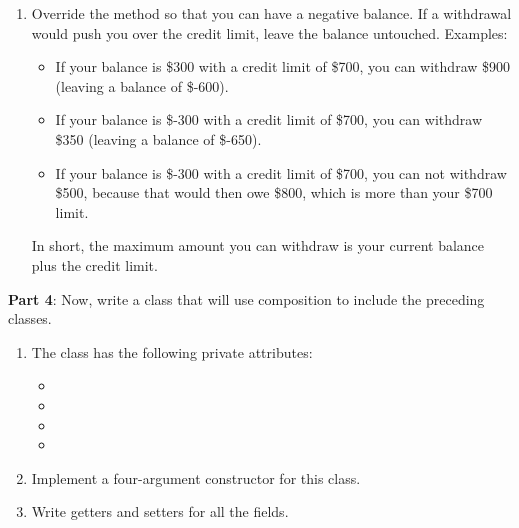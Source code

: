 \begin{exercise}
\begin{enumerate}
\item Override the  method so that you can have a negative balance. If a withdrawal would push you over the credit limit, leave the balance untouched. Examples:

\begin{itemize}
\item If your balance is \$300 with a credit limit of \$700, you can withdraw \$900 (leaving a balance of \$-600).
\item If your balance is \$-300 with a credit limit of \$700, you can withdraw \$350 (leaving a balance of \$-650).
\item If your balance is \$-300 with a credit limit of \$700, you can not withdraw \$500, because that would then owe \$800, which is more than your \$700 limit.
\end{itemize}

In short, the maximum amount you can withdraw is your current balance plus the credit limit.


\end{enumerate}

{\bf Part 4}: Now, write a  class that will use composition to include the preceding classes.

\begin{enumerate}
\item The  class has the following private attributes:

\begin{itemize}
\item {}
\item {}
\item {}
\item {}
\end{itemize}

\item Implement a four-argument constructor for this class.

\item Write getters and setters for all the fields.
\end{enumerate}


\end{exercise}
